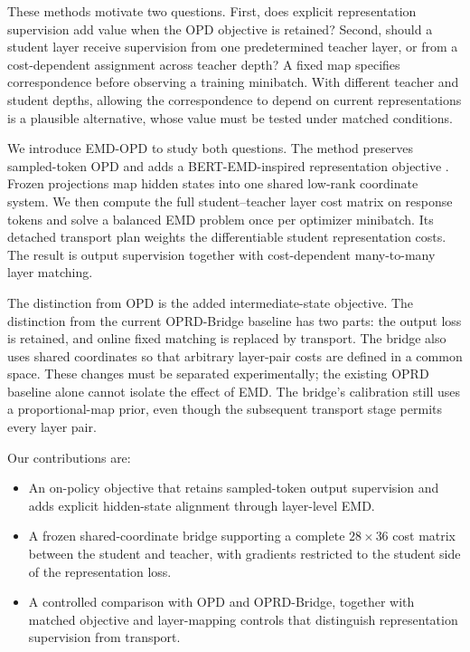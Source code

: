 \documentclass[10pt,twocolumn]{article}
\newcommand{\method}{\textsc{EMD-OPD}}
\begin{document}
These methods motivate two questions. First, does explicit representation supervision add value when the OPD objective is retained? Second, should a student layer receive supervision from one predetermined teacher layer, or from a cost-dependent assignment across teacher depth? A fixed map specifies correspondence before observing a training minibatch. With different teacher and student depths, allowing the correspondence to depend on current representations is a plausible alternative, whose value must be tested under matched conditions.

We introduce \method{} to study both questions. The method preserves sampled-token OPD and adds a BERT-EMD-inspired representation objective \cite{li2020bertemd}. Frozen projections map hidden states into one shared low-rank coordinate system. We then compute the full student--teacher layer cost matrix on response tokens and solve a balanced EMD problem once per optimizer minibatch. Its detached transport plan weights the differentiable student representation costs. The result is output supervision together with cost-dependent many-to-many layer matching.

The distinction from OPD is the added intermediate-state objective. The distinction from the current OPRD-Bridge baseline has two parts: the output loss is retained, and online fixed matching is replaced by transport. The bridge also uses shared coordinates so that arbitrary layer-pair costs are defined in a common space. These changes must be separated experimentally; the existing OPRD baseline alone cannot isolate the effect of EMD. The bridge's calibration still uses a proportional-map prior, even though the subsequent transport stage permits every layer pair.

Our contributions are:
\begin{itemize}
    \item An on-policy objective that retains sampled-token output supervision and adds explicit hidden-state alignment through layer-level EMD.
    \item A frozen shared-coordinate bridge supporting a complete $28\times36$ cost matrix between the student and teacher, with gradients restricted to the student side of the representation loss.
    \item A controlled comparison with OPD and OPRD-Bridge, together with matched objective and layer-mapping controls that distinguish representation supervision from transport.
\end{itemize}
\end{document}
